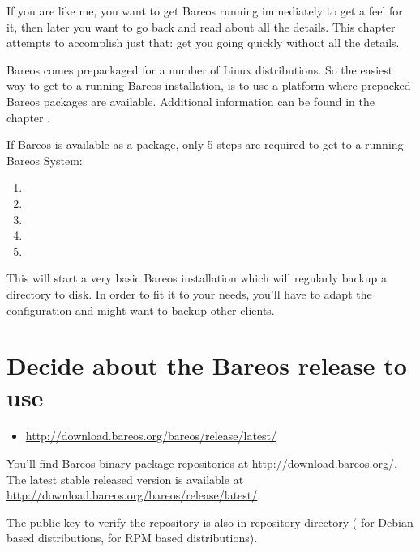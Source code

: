 If you are like me, you want to get Bareos running immediately to get a feel
for it, then later you want to go back and read about all the details. This
chapter attempts to accomplish just that: get you going quickly without all
the details.

Bareos comes prepackaged for a number of Linux distributions.
So the easiest way to get to a running Bareos installation, 
is to use a platform where prepacked Bareos packages are available.
Additional information can be found in the chapter .


If Bareos is available as a package, 
only 5 steps are required to get to a running Bareos System:
\begin{enumerate}
    \item {}
    \item {}
    \item {}
    \item {}
    \item {}
\end{enumerate}

This will start a very basic Bareos installation which will regularly backup a directory to disk.
In order to fit it to your needs, you'll have to adapt the configuration and might want to backup other clients.

\section{Decide about the Bareos release to use}
    \label{sec:AddSoftwareRepository}

\begin{itemize}
   \item \url{http://download.bareos.org/bareos/release/latest/}
\end{itemize}

You'll find Bareos binary package repositories at \url{http://download.bareos.org/}.
The latest stable released version is available at \url{http://download.bareos.org/bareos/release/latest/}.

The public key to verify the repository is also in repository directory
( for Debian based distributions,  for RPM based distributions).

